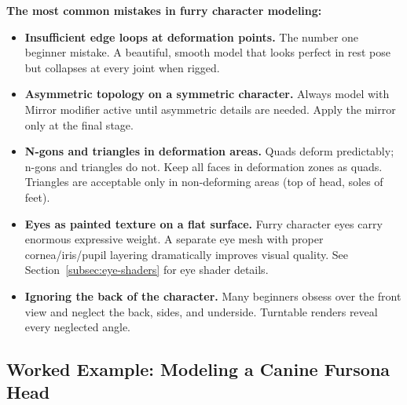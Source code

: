 \begin{warningbox}
\textbf{The most common mistakes in furry character modeling:}
\begin{itemize}[leftmargin=1.5em]
  \item \textbf{Insufficient edge loops at deformation points.} The number one beginner mistake. A beautiful, smooth model that looks perfect in rest pose but collapses at every joint when rigged.
  \item \textbf{Asymmetric topology on a symmetric character.} Always model with Mirror modifier active until asymmetric details are needed. Apply the mirror only at the final stage.
  \item \textbf{N-gons and triangles in deformation areas.} Quads deform predictably; n-gons and triangles do not. Keep all faces in deformation zones as quads. Triangles are acceptable only in non-deforming areas (top of head, soles of feet).
  \item \textbf{Eyes as painted texture on a flat surface.} Furry character eyes carry enormous expressive weight. A separate eye mesh with proper cornea/iris/pupil layering dramatically improves visual quality. See Section~\ref{subsec:eye-shaders} for eye shader details.
  \item \textbf{Ignoring the back of the character.} Many beginners obsess over the front view and neglect the back, sides, and underside. Turntable renders reveal every neglected angle.
\end{itemize}
\end{warningbox}



\subsection{Worked Example: Modeling a Canine Fursona Head}
\label{subsec:worked-canine-head}

